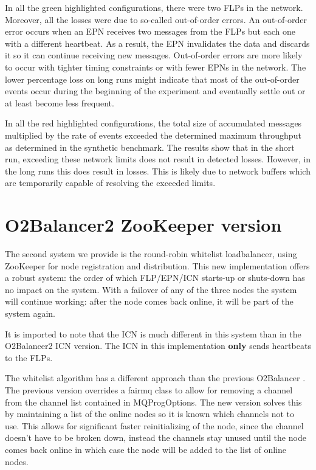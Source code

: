 \documentclass[]{article}
\begin{document}
In all the green highlighted configurations, there were two FLPs in the network. Moreover, all the losses were due to so-called out-of-order errors. An out-of-order error occurs when an EPN receives two messages from the FLPs but each one with a different heartbeat. As a result, the EPN invalidates the data and discards it so it can continue receiving new messages. Out-of-order errors are more likely to occur with tighter timing constraints or with fewer EPNs in the network. The lower percentage loss on long runs might indicate that most of the out-of-order events occur during the beginning of the experiment and eventually settle out or at least become less frequent.

In all the red highlighted configurations, the total size of accumulated messages multiplied by the rate of events exceeded the determined maximum throughput as determined in the synthetic benchmark. The results show that in the short run, exceeding these network limits does not result in detected losses. However, in the long runs this does result in losses. This is likely due to network buffers which are temporarily capable of resolving the exceeded limits.


\section{O2Balancer2 ZooKeeper version}
The second system we provide is the round-robin whitelist loadbalancer, using ZooKeeper\cite{apache_zookeeper} for node registration and distribution. This new implementation offers a robust system: the order of which FLP/EPN/ICN starts-up or shuts-down has no impact on the system. With a failover of any of the three nodes the system will continue working: after the node comes back online, it will be part of the system again. 

It is imported to note that the ICN is much different in this system than in the O2Balancer2 ICN version. The ICN in this implementation \textbf{only} sends heartbeats to the FLPs.

The whitelist algorithm has a different approach than the previous O2Balancer \cite{O2Balancer_github}. The previous version overrides a fairmq class to allow for removing a channel from the channel list contained in MQProgOptions.  The new version solves this by maintaining a list of the online nodes so it is known which channels not to use. This allows for significant faster reinitializing of the node, since the channel doesn’t have to be broken down, instead the channels stay unused until the node comes back online in which case the node will be added to the list of online nodes. 
\end{document}
